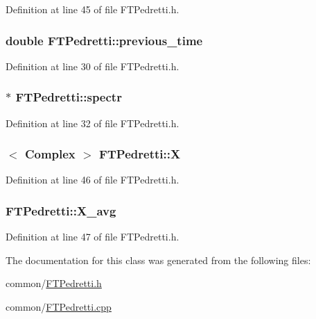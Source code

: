 Definition at line 45 of file FTPedretti.h.

\hypertarget{classFTPedretti_a363822135e76101433c55c8556da68e5}{
\subsubsection[{previous\_\-time}]{\setlength{\rightskip}{0pt plus 5cm}double {\bf FTPedretti::previous\_\-time}}}
\label{classFTPedretti_a363822135e76101433c55c8556da68e5}


Definition at line 30 of file FTPedretti.h.

\hypertarget{classFTPedretti_a154536c2195506b9c254e417cf752cb6}{
\subsubsection[{spectr}]{$\ast$ {\bf FTPedretti::spectr}}}
\label{classFTPedretti_a154536c2195506b9c254e417cf752cb6}


Definition at line 32 of file FTPedretti.h.

\hypertarget{classFTPedretti_a3b9e230976542d982323faaae89341bf}{
\subsubsection[{X}]{$<$ {\bf Complex} $>$ {\bf FTPedretti::X}}}
\label{classFTPedretti_a3b9e230976542d982323faaae89341bf}


Definition at line 46 of file FTPedretti.h.

\hypertarget{classFTPedretti_a900b82719031d79c46298d544eb1d313}{
\subsubsection[{X\_\-avg}]{ {\bf FTPedretti::X\_\-avg}}}
\label{classFTPedretti_a900b82719031d79c46298d544eb1d313}


Definition at line 47 of file FTPedretti.h.



The documentation for this class was generated from the following files:\begin{DoxyCompactItemize}
\item 
common/\hyperlink{FTPedretti_8h}{FTPedretti.h}\item 
common/\hyperlink{FTPedretti_8cpp}{FTPedretti.cpp}\end{DoxyCompactItemize}
